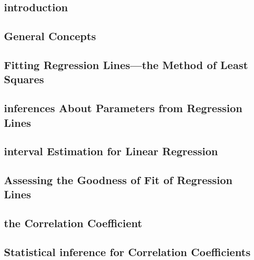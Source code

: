 \documentclass[12pt,]{article}
\begin{document}
\hypertarget{introduction-7}{%
\subsection{introduction}\label{introduction-7}}

\hypertarget{general-concepts-2}{%
\subsection{General Concepts}\label{general-concepts-2}}

\hypertarget{fitting-regression-linesthe-method-of-least-squares}{%
\subsection{Fitting Regression Lines---the Method of Least
Squares}\label{fitting-regression-linesthe-method-of-least-squares}}

\hypertarget{inferences-about-parameters-from-regression-lines}{%
\subsection{inferences About Parameters from Regression
Lines}\label{inferences-about-parameters-from-regression-lines}}

\hypertarget{interval-estimation-for-linear-regression}{%
\subsection{interval Estimation for Linear
Regression}\label{interval-estimation-for-linear-regression}}

\hypertarget{assessing-the-goodness-of-fit-of-regression-lines}{%
\subsection{Assessing the Goodness of Fit of Regression
Lines}\label{assessing-the-goodness-of-fit-of-regression-lines}}

\hypertarget{the-correlation-coefficient}{%
\subsection{the Correlation
Coefficient}\label{the-correlation-coefficient}}

\hypertarget{statistical-inference-for-correlation-coefficients}{%
\subsection{Statistical inference for Correlation
Coefficients}\label{statistical-inference-for-correlation-coefficients}}
\end{document}
